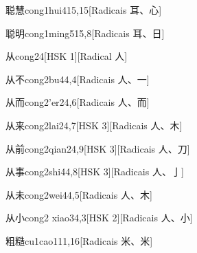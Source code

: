 \begin{entry}{聪慧}{cong1hui4}{15,15}[Radicais ⽿、⼼]
\end{entry}

\begin{entry}{聪明}{cong1ming5}{15,8}[Radicais ⽿、⽇]
\end{entry}

\begin{entry}{从}{cong2}{4}[HSK 1][Radical ⼈]
\end{entry}

\begin{entry}{从不}{cong2bu4}{4,4}[Radicais ⼈、⼀]
\end{entry}

\begin{entry}{从而}{cong2'er2}{4,6}[Radicais ⼈、⽽]
\end{entry}

\begin{entry}{从来}{cong2lai2}{4,7}[HSK 3][Radicais ⼈、⽊]
\end{entry}

\begin{entry}{从前}{cong2qian2}{4,9}[HSK 3][Radicais ⼈、⼑]
\end{entry}

\begin{entry}{从事}{cong2shi4}{4,8}[HSK 3][Radicais ⼈、⼅]
\end{entry}

\begin{entry}{从未}{cong2wei4}{4,5}[Radicais ⼈、⽊]
\end{entry}

\begin{entry}{从小}{cong2 xiao3}{4,3}[HSK 2][Radicais ⼈、⼩]
\end{entry}

\begin{entry}{粗糙}{cu1cao1}{11,16}[Radicais ⽶、⽶]
\end{entry}

